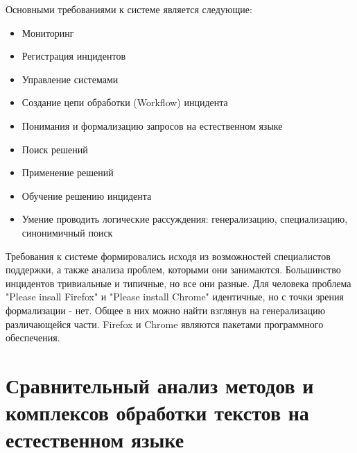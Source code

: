 Основными требованиями к системе является следующие:
\begin{itemize}
	\item Мониторинг
	\item Регистрация инцидентов
	\item Управление системами
	\item Создание цепи обработки (Workflow) инцидента
	\item Понимания и формализацию запросов на естественном языке
	\item Поиск решений
	\item Применение решений
	\item Обучение решению инцидента
	\item Умение проводить логические рассуждения: генерализацию, специализацию, синонимичный поиск
\end{itemize}

Требования к системе формировались исходя из возможностей специалистов поддержки, а также анализа проблем, которыми они занимаются. Большинство инцидентов тривиальные и типичные, но все они разные. Для человека проблема "Please insall Firefox" и "Please install Chrome" идентичные, но с точки зрения формализации - нет. Общее в них можно найти взглянув на генерализацию различающейся части. Firefox и Chrome являются пакетами программного обеспечения.



\clearpage

\section{Сравнительный анализ методов и комплексов обработки текстов на естественном языке}


